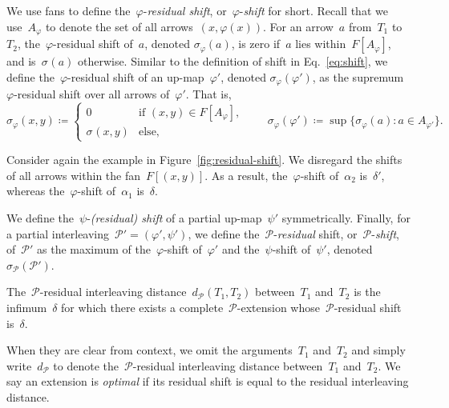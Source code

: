\documentclass[a4paper,UKenglish, autoref, thm-restate, cleveref]{lipics-v2021}
\newcommand{\shift}[1]{\sigma_{#1}}
\newcommand{\resdist}[1]{d_{#1}}
\renewcommand{\phi}{\varphi}
\renewcommand{\P}{\mathcal{P}}
\renewcommand{\mid}{:}
\begin{document}
We use fans to define the~$\phi$-\emph{residual shift}, or~$\phi$-\emph{shift} for short.
Recall that we use~$A_\phi$ to denote the set of all arrows~$(x, \phi(x))$.
For an arrow~$a$ from~$T_1$ to~$T_2$, the~$\phi$-residual shift of~$a$, denoted $\shift{\phi}(a)$, is zero if~$a$ lies within~$F[A_\phi]$, and is~$\shift{}(a)$ otherwise.
Similar to the definition of shift in Eq.~\ref{eq:shift}, we define the~$\phi$-residual shift of an up-map~$\phi'$, denoted $\shift{\phi}(\phi')$, as the supremum~$\phi$-residual shift over all arrows of~$\phi'$.
That is,
\[
\shift{\phi}(x, y) \coloneqq \begin{cases}
    0 & \text{if } (x, y) \in F[A_\phi],\\
    \shift{}(x, y) & \text{else,}
\end{cases} \qquad
\shift{\phi}(\phi') \coloneqq \sup\{\shift{\phi}(a) \mid a \in A_{\phi'}\}.
\]

Consider again the example in Figure~\ref{fig:residual-shift}.
We disregard the shifts of all arrows within the fan~$F[(x, y)]$.
As a result, the~$\phi$-shift of~$\alpha_2$ is~$\delta'$, whereas the~$\phi$-shift of~$\alpha_1$ is~$\delta$.

We define the~$\psi$-\emph{(residual) shift} of a partial up-map~$\psi'$ symmetrically.
Finally, for a partial interleaving~$\P' = (\phi', \psi')$, we define the~$\P$-\emph{residual} shift, or~$\P$-\emph{shift}, of~$\P'$ as the maximum of the~$\phi$-shift of~$\phi'$ and the~$\psi$-shift of~$\psi'$, denoted~$\shift{\P}(\P')$.

\begin{definition}\label{def:constrained-interleaving-distance}
	The~$\P$-residual interleaving distance~$\resdist{\P}(T_1, T_2)$ between~$T_1$ and~$T_2$ is the infimum~$\delta$ for which there exists a complete~$\P$-extension whose~$\P$-residual shift is~$\delta$.
\end{definition}

\noindent
When they are clear from context, we omit the arguments~$T_1$ and~$T_2$ and simply write~$\resdist{\P}$ to denote the~$\P$-residual interleaving distance between~$T_1$ and~$T_2$.
We say an extension is \emph{optimal} if its residual shift is equal to the residual interleaving distance.
\end{document}
